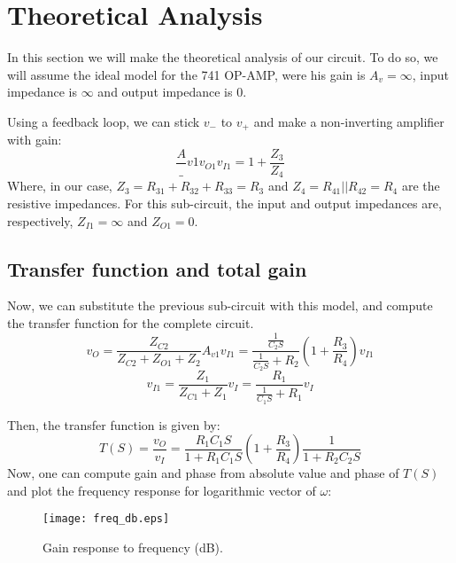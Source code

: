\section{Theoretical Analysis}
\label{sec:analysis}

\par In this section we will make the theoretical analysis of our circuit. To do so, we will assume the ideal model for the 741 OP-AMP, were his gain is $A_v=\infty$, input impedance is $\infty$ and output impedance is $0$.

\par Using a feedback loop, we can stick $v_-$ to $v_+$ and make a non-inverting amplifier with gain: 
\begin{equation}
\frac A_{v1}{v_{O1}}{v_{I1}}=1+\frac{Z_3}{Z_4}
\end{equation}
Where, in our case, $Z_3=R_{31}+R_{32}+R_{33}=R_3$ and $Z_4=R_{41}||R_{42}=R_4$ are the resistive impedances. For this sub-circuit, the input and output impedances are, respectively, $Z_{I1}=\infty$ and $Z_{O1}=0$. 

\subsection{Transfer function and total gain}

\par Now, we can substitute the previous sub-circuit with this model, and compute the transfer function for the complete circuit. 
\begin{equation}
v_O=\frac{Z_{C2}}{Z_{C2}+Z_{O1}+Z_{2}}A_{v1}v_{I1}=\frac{\frac{1}{C_2S}}{\frac{1}{C_2S}+R_2}(1+\frac{R_3}{R_4})v_{I1}
\end{equation}
\begin{equation}
v_{I1}=\frac{Z_{1}}{Z_{C1}+Z_{1}}v_{I}=\frac{R_1}{\frac{1}{C_1S}+R_1}v_{I}
\end{equation}

Then, the transfer function is given by:
\begin{equation}
T(S)=\frac{v_O}{v_I}=\frac{R_1C_1S}{1+R_1C_1S}(1+\frac{R_3}{R_4})\frac{1}{1+R_2C_2S}
\end{equation}
 Now, one can compute gain and phase from absolute value and phase of $T(S)$ and plot the frequency response for logarithmic vector of $\omega$:
 
 \begin{figure}[H] \centering
\texttt{[image: freq\_db.eps]}
\caption{Gain response to frequency (dB).}
\label{fig:gain}
\end{figure}

